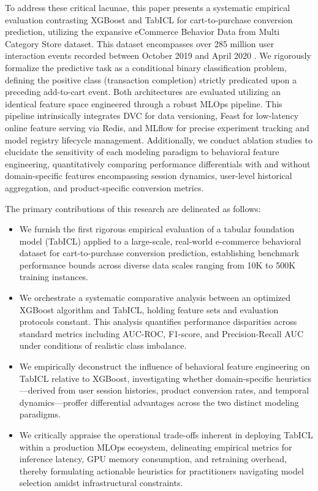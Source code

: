 \documentclass[conference]{IEEEtran}
\begin{document}
To address these critical lacunae, this paper presents a systematic empirical evaluation contrasting XGBoost and TabICL for cart-to-purchase conversion prediction, utilizing the expansive eCommerce Behavior Data from Multi Category Store dataset. This dataset encompasses over 285 million user interaction events recorded between October 2019 and April 2020 \cite{kechinov2020ecommerce}. We rigorously formalize the predictive task as a conditional binary classification problem, defining the positive class (transaction completion) strictly predicated upon a preceding add-to-cart event. Both architectures are evaluated utilizing an identical feature space engineered through a robust MLOps pipeline. This pipeline intrinsically integrates DVC for data versioning, Feast for low-latency online feature serving via Redis, and MLflow for precise experiment tracking and model registry lifecycle management. Additionally, we conduct ablation studies to elucidate the sensitivity of each modeling paradigm to behavioral feature engineering, quantitatively comparing performance differentials with and without domain-specific features encompassing session dynamics, user-level historical aggregation, and product-specific conversion metrics.

The primary contributions of this research are delineated as follows:

\begin{itemize}
    \item We furnish the first rigorous empirical evaluation of a tabular foundation model (TabICL) applied to a large-scale, real-world e-commerce behavioral dataset for cart-to-purchase conversion prediction, establishing benchmark performance bounds across diverse data scales ranging from 10K to 500K training instances.
    \item We orchestrate a systematic comparative analysis between an optimized XGBoost algorithm and TabICL, holding feature sets and evaluation protocols constant. This analysis quantifies performance disparities across standard metrics including AUC-ROC, F1-score, and Precision-Recall AUC under conditions of realistic class imbalance.
    \item We empirically deconstruct the influence of behavioral feature engineering on TabICL relative to XGBoost, investigating whether domain-specific heuristics---derived from user session histories, product conversion rates, and temporal dynamics---proffer differential advantages across the two distinct modeling paradigms.
    \item We critically appraise the operational trade-offs inherent in deploying TabICL within a production MLOps ecosystem, delineating empirical metrics for inference latency, GPU memory consumption, and retraining overhead, thereby formulating actionable heuristics for practitioners navigating model selection amidst infrastructural constraints.
\end{itemize}
\end{document}
